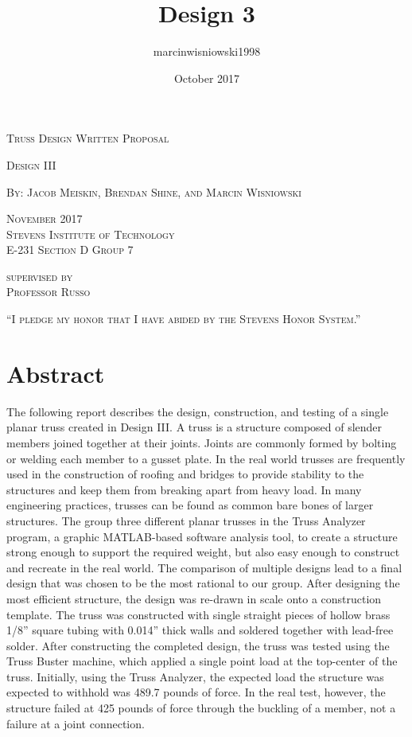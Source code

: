 \documentclass{article}
\title{Design 3}
\author{marcinwisniowski1998 }
\date{October 2017}
\begin{document}
\begin{titlepage}
    \centering
	{\scshape\LARGE Truss Design Written Proposal\par}
	\vspace{1cm}
	{\scshape Design III\par}
	\vspace{1cm}
	{\scshape By: Jacob Meiskin, Brendan Shine, and Marcin Wisniowski \par}
	\vfill
	{\scshape November 2017\\Stevens Institute of Technology\\E-231 Section D Group 7\par}
	\vspace{.5cm}
	{\scshape supervised by\\Professor Russo \par}
    \vfill
	{\scshape“I pledge my honor that I have abided by the Stevens Honor System.”}
	\vspace{1cm}
\end{titlepage}

\section{Abstract}
 The following report describes the design, construction, and testing of a single planar truss created in Design III. A truss is a structure composed of slender members joined together at their joints. Joints are commonly formed by bolting or welding each member to a gusset plate. In the real world trusses are frequently used in the construction of roofing and bridges to provide stability to the structures and keep them from breaking apart from heavy load. In many engineering practices, trusses can be found as common bare bones of larger structures. The group three different planar trusses in the Truss Analyzer program, a graphic MATLAB-based software analysis tool, to create a structure strong enough to support the required weight, but also easy enough to construct and recreate in the real world. The comparison of multiple designs lead to a final design that was chosen to be the most rational to our group. After designing the most efficient structure, the design was re-drawn in scale onto a construction template. The truss was constructed with single straight pieces of hollow brass 1/8” square tubing with 0.014” thick walls and soldered together with lead-free solder. After constructing the completed design, the truss was tested using the Truss Buster machine, which applied a single point load at the top-center of the truss. Initially, using the Truss Analyzer, the expected load the structure was expected to withhold was 489.7 pounds of force. In the real test, however, the structure failed at 425 pounds of force through the buckling of a member, not a failure at a joint connection.
\end{document}
